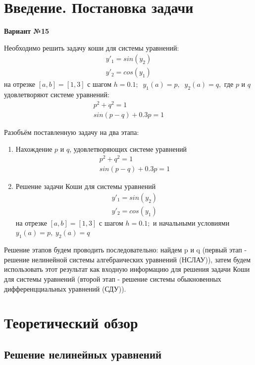 \documentclass[a4paper,12pt]{article}
\begin{document}
	
	\setcounter{section}{0}
	\setcounter{page}{2}
	\tableofcontents
	\clearpage
	\section{Введение. Постановка задачи}
	\textbf{Вариант №15}
	
	Необходимо решить задачу коши для системы уравнений:
$$
\begin{array}{c}
	y'_{1}=sin(y_{2})\\
	y'_{2}=cos(y_{1})	
\end{array}
$$
на отрезке $ [a,b]=[1,3] $ с шагом $ h=0.1;\;\; y_{1}(a)=p,\;\;y_{2}(a)=q,$ где $ p $ и $ q $ удовлетворяют системе уравнений:
$$
\begin{array}{c}
	p^{2}+q^{2}=1\\
	sin(p-q)+0.3p=1
\end{array}
$$

Разобъём поставленную задачу на два этапа:
\begin{enumerate}
	\item Нахождение $ p $ и $ q $, удовлетворяющих системе уравнений
	$$
	\begin{array}{c}
		p^{2}+q^{2}=1\\
		sin(p-q)+0.3p=1
	\end{array}
	$$
	\item Решение задачи Коши для системы уравнений
	$$
	\begin{array}{c}
		y'_{1}=sin(y_{2})\\
		y'_{2}=cos(y_{1})	
	\end{array}
	$$
	на отрезке $ [a,b]=[1,3] $ с шагом $ h=0.1;$ и начальными условиями $ y_{1}(a)=p,\;y_{2}(a)=q$
\end{enumerate}

Решение этапов будем проводить последовательно: найдем p и q (первый этап - решение нелинейной системы алгебраических уравнений (НСЛАУ)), затем будем использовать этот результат как входную информацию для решения задачи Коши для системы уравнений (второй этап - решение системы обыкновенных дифференцциальных уравнений (СДУ)).
\clearpage
\section{Теоретический обзор}

\subsection{Решение нелинейных уравнений}
\end{document}
